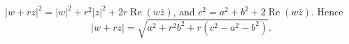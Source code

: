 $|w+rz|^2=|w|^2+r^2|z|^2+2r\operatorname{Re}(w\bar z)$, and $c^2=a^2+b^2+2\operatorname{Re}(w\bar z)$. Hence
\[|w+rz|=\boxed{\sqrt{a^2+r^2b^2+r\left(c^2-a^2-b^2\right)}}.\]

